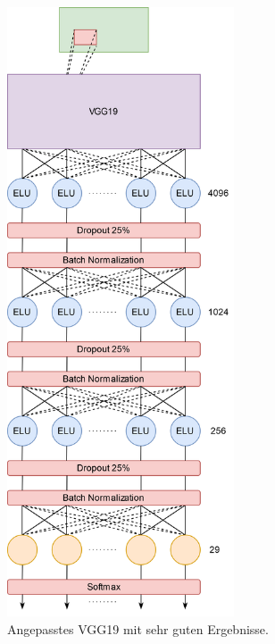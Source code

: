 \documentclass[11pt,bibliography=totocnumbered]{scrartcl}
\begin{document}
\begin{figure}[H]
	\centering
	\includegraphics[width=0.60\textwidth]{vgg_19_used}
	\vspace*{-3mm}
	\caption[Angepasstes VGG19]{Angepasstes VGG19 mit sehr guten Ergebnisse.}
	\label{fig:vgg_19_used}
\end{figure}
\vspace*{-5mm}
\end{document}
